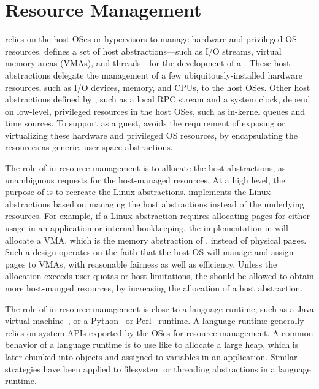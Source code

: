\section{Resource Management}
\label{sec:libos:resource}


\Thelibos{}
relies on the host OSes or hypervisors to manage hardware and privileged OS resources.
\Thehostabi{}
defines a set of host abstractions---such as I/O streams, virtual memory areas (VMAs), and threads---for the development of a \libos{}.
These host abstractions delegate
the management of a few ubiquitously-installed hardware resources, such as I/O devices, memory, and CPUs,
to the host OSes.
Other host abstractions defined
by \thehostabi{},
such as a local RPC stream and a system clock,
depend on low-level, privileged resources in the host OSes,
such as in-kernel queues and time sources.
To support \thelibos{} as a guest,
\thehostabi{} avoids the requirement of exposing or virtualizing %
these hardware and privileged OS resources,
by encapsulating the resources as generic, user-space abstractions.



The role of \thelibos{} in resource management
is to allocate the host abstractions,
as unambiguous requests %
for the host-managed resources.
At a high level, the purpose of \thelibos{} is to recreate the Linux abstractions.
\Thelibos{} implements the Linux abstractions
based on managing the host abstractions instead of
the underlying resources.
For example, if a Linux abstraction requires allocating pages
for either usage in an application or
internal bookkeeping,
the implementation in
\thelibos{} will allocate a VMA, which is the memory abstraction of \thehostabi{}, instead of physical pages.
Such a \libos{} design operates on the faith that the host OS will manage and assign pages to VMAs, with reasonable fairness as well as efficiency.
Unless the allocation exceeds user quotas or host limitations,
the \libos{} should be allowed to obtain more host-manged resources,
by increasing the allocation of a host abstraction.



The role of \thelibos{} in resource management is close to a language runtime, such as a Java virtual machine~\cite{hotspot,j9,alpern2000jalapeno}, or a Python~\cite{python} or Perl~\cite{perl} runtime.
A language runtime generally relies on system APIs exported by the OSes
for resource management.
A common behavior of a language runtime
is to use \linuxapis{} like  to allocate a large heap,
which is later chunked into objects
and assigned to variables in an application.
Similar strategies have been applied to
filesystem or threading abstractions in a language runtime. %



